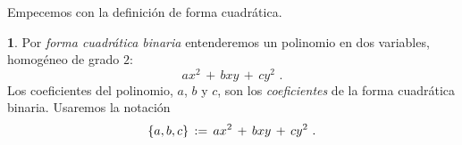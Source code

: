 \theoremstyle{plain}
\newtheorem{teoDefiniciones}{\teoname}[section]
\newtheorem{lemaDefiniciones}[teoDefiniciones]{\lemaname}
\newtheorem{coroDefiniciones}[teoDefiniciones]{\coroname}

\theoremstyle{definition}
\newtheorem{defDefiniciones}[teoDefiniciones]{}
\newtheorem{obsDefiniciones}[teoDefiniciones]{\obsname}
\newtheorem{ejemDefiniciones}[teoDefiniciones]{\ejemname}


Empecemos con la definici\'on de forma cuadr\'atica.

\begin{defDefiniciones}\label{def:definiciones:forma}
	Por \emph{forma cuadr\'atica binaria} entenderemos un
	polinomio en dos variables, homog\'eneo de grado $2$:
	\begin{displaymath}
		ax^2\,+\,bxy\,+\,cy^2
		\text{ .}
	\end{displaymath}
	Los coeficientes del polinomio, $a$, $b$ y $c$, son los
	\emph{coeficientes} de la forma cuadr\'atica binaria.
	Usaremos la notaci\'on
	\begin{displaymath}
		\left\{a,b,c\right\}\,:=\,ax^2\,+\,bxy\,+\,cy^2
		\text{ .}
	\end{displaymath}
\end{defDefiniciones}



